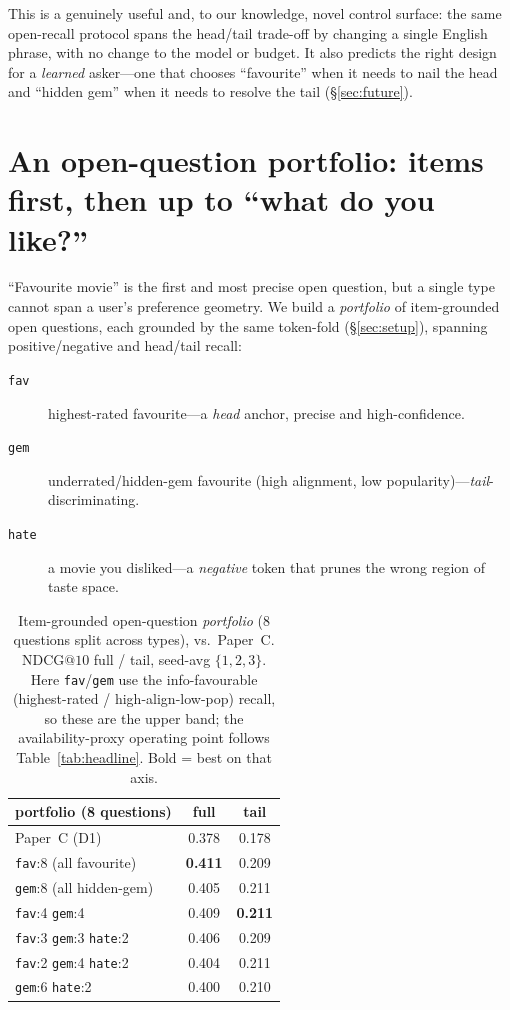 \documentclass[11pt]{article}
\makeatletter
\newcommand{\ndcg}{\mathrm{NDCG@}10}
\makeatother
\begin{document}
This is a genuinely useful and, to our knowledge, novel control surface: the same open-recall protocol spans the
head/tail trade-off by changing a single English phrase, with no change to the model or budget. It also predicts the
right design for a \emph{learned} asker---one that chooses ``favourite'' when it needs to nail the head and ``hidden
gem'' when it needs to resolve the tail (\S\ref{sec:future}).

\section{An open-question portfolio: items first, then up to ``what do you like?''}
\label{sec:portfolio}
``Favourite movie'' is the first and most precise open question, but a single type cannot span a user's preference
geometry. We build a \emph{portfolio} of item-grounded open questions, each grounded by the same token-fold
(\S\ref{sec:setup}), spanning positive/negative and head/tail recall:
\begin{description}
  \item[\texttt{fav}] highest-rated favourite---a \emph{head} anchor, precise and high-confidence.
  \item[\texttt{gem}] underrated/hidden-gem favourite (high alignment, low popularity)---\emph{tail}-discriminating.
  \item[\texttt{hate}] a movie you disliked---a \emph{negative} token that prunes the wrong region of taste space.
\end{description}

\begin{table}[t]
\centering
\caption{Item-grounded open-question \emph{portfolio} ($8$ questions split across types), vs.\ Paper~C. $\ndcg$
full / tail, seed-avg $\{1,2,3\}$. Here \texttt{fav}/\texttt{gem} use the info-favourable (highest-rated /
high-align-low-pop) recall, so these are the upper band; the availability-proxy operating point follows Table~\ref{tab:headline}.
Bold = best on that axis.}
\label{tab:portfolio}
\begin{tabular}{lcc}
\toprule
portfolio (8 questions) & full & tail \\
\midrule
Paper~C (D1)                       & 0.378 & 0.178 \\
\texttt{fav}:8 (all favourite)     & \textbf{0.411} & 0.209 \\
\texttt{gem}:8 (all hidden-gem)    & 0.405 & 0.211 \\
\texttt{fav}:4 \texttt{gem}:4      & 0.409 & \textbf{0.211} \\
\texttt{fav}:3 \texttt{gem}:3 \texttt{hate}:2 & 0.406 & 0.209 \\
\texttt{fav}:2 \texttt{gem}:4 \texttt{hate}:2 & 0.404 & 0.211 \\
\texttt{gem}:6 \texttt{hate}:2     & 0.400 & 0.210 \\
\bottomrule
\end{tabular}
\end{table}
\end{document}
